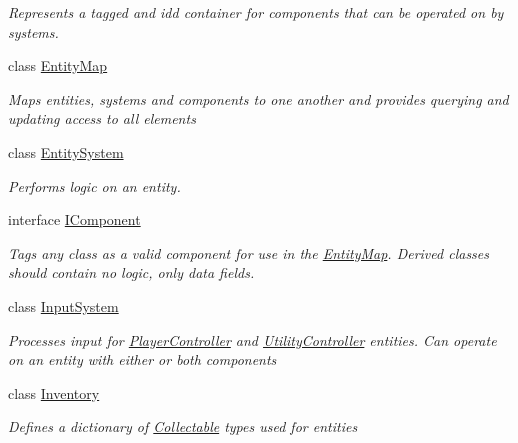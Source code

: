 \begin{DoxyCompactItemize}
\begin{DoxyCompactList}\small\item\em Represents a tagged and id\textquotesingle{}d container for components that can be operated on by systems. \end{DoxyCompactList}\item 
class \hyperlink{class_midnight_blue_1_1_engine_1_1_entity_component_1_1_entity_map}{Entity\+Map}
\begin{DoxyCompactList}\small\item\em Maps entities, systems and components to one another and provides querying and updating access to all elements \end{DoxyCompactList}\item 
class \hyperlink{class_midnight_blue_1_1_engine_1_1_entity_component_1_1_entity_system}{Entity\+System}
\begin{DoxyCompactList}\small\item\em Performs logic on an entity. \end{DoxyCompactList}\item 
interface \hyperlink{interface_midnight_blue_1_1_engine_1_1_entity_component_1_1_i_component}{I\+Component}
\begin{DoxyCompactList}\small\item\em Tags any class as a valid component for use in the \hyperlink{class_midnight_blue_1_1_engine_1_1_entity_component_1_1_entity_map}{Entity\+Map}. Derived classes should contain no logic, only data fields. \end{DoxyCompactList}\item 
class \hyperlink{class_midnight_blue_1_1_engine_1_1_entity_component_1_1_input_system}{Input\+System}
\begin{DoxyCompactList}\small\item\em Processes input for \hyperlink{class_midnight_blue_1_1_engine_1_1_entity_component_1_1_player_controller}{Player\+Controller} and \hyperlink{class_midnight_blue_1_1_engine_1_1_entity_component_1_1_utility_controller}{Utility\+Controller} entities. Can operate on an entity with either or both components \end{DoxyCompactList}\item 
class \hyperlink{class_midnight_blue_1_1_engine_1_1_entity_component_1_1_inventory}{Inventory}
\begin{DoxyCompactList}\small\item\em Defines a dictionary of \hyperlink{class_midnight_blue_1_1_engine_1_1_collectable}{Collectable} types used for entities \end{DoxyCompactList}\item 

\end{DoxyCompactItemize}
